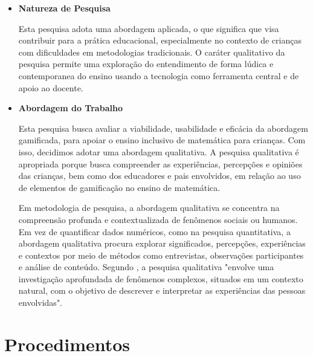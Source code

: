 \begin{itemize}
    \item \textbf{Natureza de Pesquisa}
    
    Esta pesquisa adota uma abordagem aplicada, o que significa que visa contribuir para a prática educacional, especialmente no contexto de crianças com dificuldades em metodologias tradicionais. O caráter qualitativo da pesquisa permite uma exploração do entendimento de forma lúdica e contemporanea do ensino usando a tecnologia como ferramenta central e de apoio ao docente.
    \item \textbf{Abordagem do Trabalho}
    
    Esta pesquisa busca avaliar a viabilidade, usabilidade e eficácia da abordagem gamificada, para apoiar o ensino inclusivo de matemática para crianças. Com isso, decidimos adotar uma abordagem qualitativa. A pesquisa qualitativa é apropriada porque busca compreender as experiências, percepções e opiniões das crianças, bem como dos educadores e pais envolvidos, em relação ao uso de elementos de gamificação no ensino de matemática.

Em metodologia de pesquisa, a abordagem qualitativa se concentra na compreensão profunda e contextualizada de fenômenos sociais ou humanos. Em vez de quantificar dados numéricos, como na pesquisa quantitativa, a abordagem qualitativa procura explorar significados, percepções, experiências e contextos por meio de métodos como entrevistas, observações participantes e análise de conteúdo. Segundo \cite{creswell2013research}, a pesquisa qualitativa "envolve uma investigação aprofundada de fenômenos complexos, situados em um contexto natural, com o objetivo de descrever e interpretar as experiências das pessoas envolvidas". 
\end{itemize}

\section{Procedimentos}

